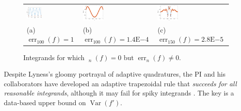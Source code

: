 \documentclass[11pt]{NSFamsart}
\DeclareMathOperator{\err}{err}
\DeclareMathOperator{\herr}{\widehat{\err}}
\DeclareMathOperator{\Var}{Var}
\begin{document}
\begin{figure}[h]
	\begin{tabular}{>{\centering}m{}@{\quad}>{\centering}m{}@{\quad}>{\centering}m{}}
		\includegraphics[width=0.3\textwidth]{ProgramsImages/SpikyFoolTrapezoidalcolor.eps} &
		\includegraphics[width=0.3\textwidth]{ProgramsImages/FlukyFoolTrapezoidalcolor.eps} &
		\includegraphics[width=0.3\textwidth]{ProgramsImages/FlukyFoolIntegralcolor.eps} 
		\tabularnewline
		(a) $\err_{100}(f) = 1 $ &
		(b) $\err_{100}(f) =  1.4\text{E}{-4}$ &
		(c) $\err_{150}(f) =  2.8\text{E}{-5}$
		\end{tabular}
	\caption{Integrands for which $\herr_n(f) = 0$ but 
	$\err_n(f) \ne 0$. \label{quadfail}}
\end{figure}

Despite Lyness's gloomy portrayal of adaptive quadratures, the PI and his collaborators have 
developed an adaptive trapezoidal rule that \emph{succeeds for all reasonable integrands}, although 
it 
may fail for spiky integrands \cite{HicEtal14a,HicRazYun15a}. The key is a 
data-based upper bound on $\Var(f')$.  
\end{document}
